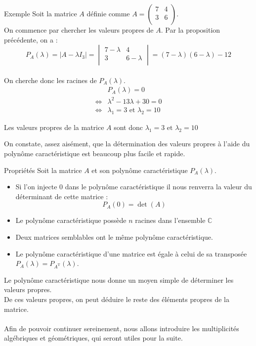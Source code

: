 \begin{bclogo}[logo=\bccrayon,noborder=true,barre=snake]{Exemple}
Soit la matrice $A$ définie comme $A=\begin{pmatrix}
7 & 4 \\
3 & 6 \\
\end{pmatrix}$.\\
On commence par chercher les valeurs propres de $A$.
Par la proposition précédente, on a :\\
$$P_A(\lambda) = | A-\lambda I_3 | =\begin{vmatrix}
7 - \lambda & 4\\
3 & 6- \lambda \\
\end{vmatrix} = (7-\lambda)(6-\lambda) -12$$\\
On cherche donc les racines de $P_A(\lambda)$.
\begin{align*}
   & P_A(\lambda)=0\\
\Leftrightarrow & {\lambda}^{2}-13\lambda +30 =0\\
\Leftrightarrow & {\lambda}_{1}=3 \text{ et } {\lambda}_{2}=10 
\end{align*}

Les valeurs propres de la matrice $A$ sont donc ${\lambda}_{1}=3 \text{ et } {\lambda}_{2}=10$
\end{bclogo}
On constate, assez aisément, que la détermination des valeurs propres à l'aide du polynôme caractéristique est beaucoup plus facile et rapide.
\begin{bclogo}[couleur=red!30,couleurBord=red,ombre=true,arrondi=0.1,logo=\bcoutil]{Propriétés}
Soit la matrice $A$ et son polynôme caractéristique $P_A(\lambda)$.
\begin{itemize}
\item Si l'on injecte $0$ dans le polynôme caractéristique il nous renverra la valeur du déterminant de cette matrice :\
$$P_A(0)=\det(A)$$
\item Le polynôme caractéristique possède $n$ racines dans l'ensemble $\mathbb{C}$
\item Deux matrices semblables ont le même polynôme caractéristique.
\item Le polynôme caractéristique d'une matrice est égale à celui de sa transposée $P_A(\lambda)=P_{A^\text{T}}(\lambda)$.
\end{itemize}
\end{bclogo}

Le polynôme caractéristique nous donne un moyen simple de déterminer les valeurs propres.\\
De ces valeurs propres, on peut déduire le reste des éléments propres de la matrice.\\
\\
Afin de pouvoir continuer sereinement, nous allons introduire les multiplicités algébriques et géométriques, qui seront utiles pour la suite.

